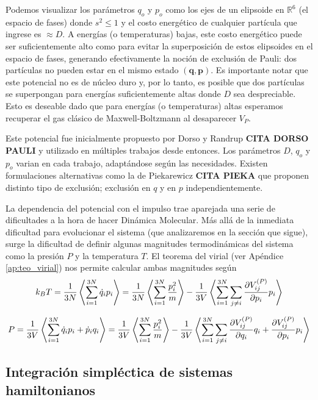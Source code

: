 Podemos visualizar los parámetros $q_o$ y $p_o$ como los ejes de un elipsoide en $\mathbb{R}^6$ (el espacio de fases) donde $s^2 \leq 1$ y el costo energético de cualquier partícula
que ingrese es $\approx D$.
A energías (o temperaturas) bajas, este costo energético puede ser suficientemente alto como para evitar la superposición de estos elipsoides en el espacio de fases, generando efectivamente
la noción de exclusión de Pauli: dos partículas no pueden estar en el mismo estado $(\mathbf{q}, \mathbf{p})$.
Es importante notar que este potencial no es de núcleo duro y, por lo tanto, es posible que dos partículas se superpongan para energías suficientemente altas donde $D$ sea despreciable.
Esto es deseable dado que para energías (o temperaturas) altas esperamos recuperar el gas clásico de Maxwell-Boltzmann al desaparecer $V_P$.

Este potencial fue inicialmente propuesto por Dorso y Randrup \textbf{CITA DORSO PAULI} y utilizado en múltiples trabajos desde entonces.
Los parámetros $D$, $q_o$ y $p_o$ varian en cada trabajo, adaptándose según las necesidades.
Existen formulaciones alternativas como la de Piekarewicz \textbf{CITA PIEKA} que proponen distinto tipo de exclusión; exclusión en $q$ y en $p$ independientemente.

La dependencia del potencial con el impulso trae aparejada una serie de dificultades a la hora de hacer Dinámica Molecular.
Más allá de la inmediata dificultad para evolucionar el sistema (que analizaremos en la sección que sigue), surge la dificultad de definir algunas magnitudes termodinámicas del
sistema como la presión $P$ y la temperatura $T$.
El teorema del virial (ver Apéndice \ref{ap:teo_virial}) nos permite calcular ambas magnitudes según
\begin{equation}{\label{eq:virial_T}}
k_B T =  \frac{1}{3N}\left<\sum_{i=1}^{3N} \dot{q}_ip_i \right>
=  \frac{1}{3N}\left<\sum_{i=1}^{3N} \frac{p_i^2}{m} \right> - \frac{1}{3V}\left< \sum_{i=1}^{3N}\sum_{j\neq i} \frac{\partial V_{ij}^{(P)}}{\partial p_i}p_i \right>
\end{equation}

\begin{equation}{\label{eq:virial_P}}
P = \frac{1}{3V}\left< \sum_{i=1}^{3N} \dot{q}_ip_i + \dot{p}_iq_i \right>
= \frac{1}{3V}\left< \sum_{i=1}^{3N} \frac{p_i^2}{m} \right> - \frac{1}{3V}\left< \sum_{i=1}^{3N}\sum_{j\neq i} \frac{\partial V_{ij}^{(P)}}{\partial q_i}q_i+\frac{\partial V_{ij}^{(P)}}{\partial p_i}p_i \right>
\end{equation}

\subsection{Integración simpléctica de sistemas hamiltonianos}

